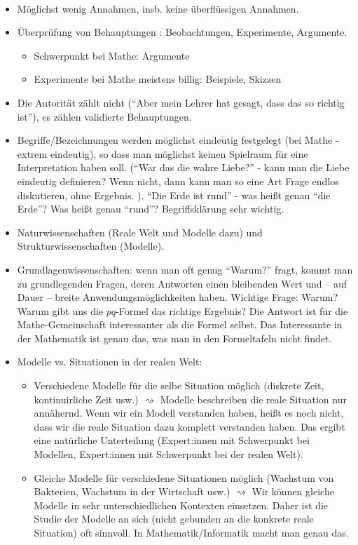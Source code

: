 \begin{bem}\ 
\begin{itemize}
	\item Möglichst wenig Annahmen, insb. keine überflüssigen Annahmen. 
	\item Überprüfung von Behauptungen : Beobachtungen, Experimente, Argumente. 
	\begin{itemize}
		\item Schwerpunkt bei Mathe: Argumente 
		\item Experimente bei Mathe meistens billig: Beispiele, Skizzen 
	\end{itemize} 
	\item Die Autorität zählt nicht (``Aber mein Lehrer hat gesagt, dass das so richtig ist''), es zählen validierte Behauptungen. 
	\item Begriffe/Bezeichnungen werden möglichst eindeutig festgelegt (bei Mathe - extrem eindeutig),  so dass man möglichst keinen Spielraum für eine Interpretation haben soll. (``War das die wahre Liebe?'' - kann man die Liebe eindeutig definieren? Wenn nicht, dann kann man so eine Art Frage endlos diskutieren, ohne Ergebnis. ). ``Die Erde ist rund'' - was heißt genau ``die Erde''? Was heißt genau ``rund''? Begriffsklärung sehr wichtig. 
	\item Naturwissenschaften (Reale Welt und Modelle dazu) und  Strukturwissenschaften (Modelle). 
	\item Grundlagenwissenschaften: wenn man oft genug ``Warum?'' fragt, kommt man zu grundlegenden Fragen, deren Antworten einen bleibenden Wert und -- auf Dauer -- breite Anwendungsmöglichkeiten haben. Wichtige Frage: Warum? Warum gibt uns die $pq$-Formel das richtige Ergebnis? Die Antwort ist für die Mathe-Gemeinschaft interessanter als die Formel selbst. Das Interessante in der Mathematik ist genau das, was man in den Formeltafeln nicht findet. 
	\item Modelle vs. Situationen in der realen Welt: 
	\begin{itemize}
			\item Verschiedene Modelle für die selbe Situation möglich (diskrete Zeit, kontinuirliche Zeit usw.) $\rightsquigarrow$ Modelle beschreiben die reale Situation nur annähernd. Wenn wir ein Modell verstanden haben, heißt es noch nicht, dass wir die reale Situation dazu komplett verstanden haben. Das ergibt eine natürliche Unterteilung (Expert:innen mit Schwerpunkt bei Modellen, Expert:innen mit Schwerpunkt bei der realen Welt). 
			\item Gleiche Modelle für verschiedene Situationen möglich (Wachstum von Bakterien, Wachstum in der Wirtschaft usw.) $\rightsquigarrow$ Wir können gleiche Modelle in sehr unterschiedlichen Kontexten einsetzen. Daher ist die Studie der Modelle an sich (nicht gebunden an die konkrete reale Situation) oft sinnvoll. In Mathematik/Informatik macht man genau das. 
	\end{itemize} 
\end{itemize} 
\end{bem}


